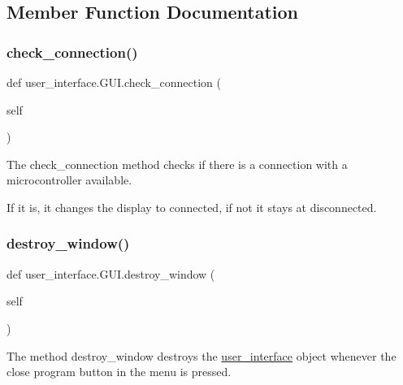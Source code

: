 \subsection{Member Function Documentation}
\mbox{\label{classuser__interface_1_1GUI_a5787b976dce9ca32ce3dacf0b96b8ee7}} 
\subsubsection{\texorpdfstring{check\+\_\+connection()}{check\_connection()}}
{\footnotesize\ttfamily def user\+\_\+interface.\+G\+U\+I.\+check\+\_\+connection (\begin{DoxyParamCaption}\item[{}]{self }\end{DoxyParamCaption})}



The check\+\_\+connection method checks if there is a connection with a microcontroller available. 

If it is, it changes the display to connected, if not it stays at disconnected. \mbox{\label{classuser__interface_1_1GUI_a1e7024c7b8168615d4d8579336d192df}} 
\subsubsection{\texorpdfstring{destroy\+\_\+window()}{destroy\_window()}}
{\footnotesize\ttfamily def user\+\_\+interface.\+G\+U\+I.\+destroy\+\_\+window (\begin{DoxyParamCaption}\item[{}]{self }\end{DoxyParamCaption})}



The method destroy\+\_\+window destroys the \hyperlink{namespaceuser__interface}{user\+\_\+interface} object whenever the close program button in the menu is pressed. 

\mbox{\label{classuser__interface_1_1GUI_a2130bcd9bdd457ba51cac0458a8d3f96}} 
